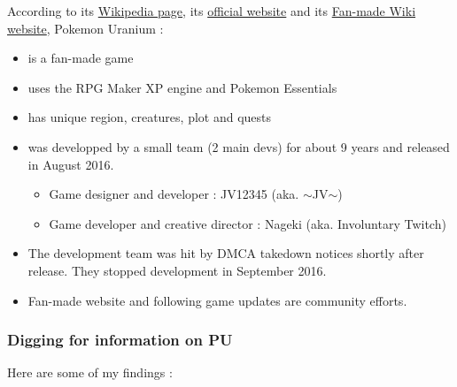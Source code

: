 \documentclass[11pt]{article}
\begin{document}
According to its \href{https://en.wikipedia.org/wiki/Pok\%C3\%A9mon_Uranium}{Wikipedia page}, its \href{http://pokemonuranium.org/}{official website} and its \href{https://pokemon-uranium.fandom.com/wiki/Main_Page}{Fan-made Wiki website}, Pokemon Uranium :
\begin{itemize}
	\item is a fan-made game
	\item uses the RPG Maker XP engine and Pokemon Essentials
	\item has unique region, creatures, plot and quests
	\item was developped by a small team (2 main devs) for about 9 years and released in August 2016.
	\begin{itemize}
		\item Game designer and developer : JV12345 (aka. $\sim$JV$\sim$)
		\item Game developer and creative director : Nageki (aka. Involuntary Twitch)
	\end{itemize}
	\item The development team was hit by DMCA takedown notices shortly after release. They stopped development in September 2016.
	\item Fan-made website and following game updates are community efforts.
\end{itemize}

\subsubsection{Digging for information on PU}

Here are some of my findings :
\end{document}
